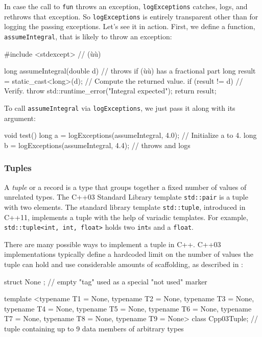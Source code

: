 In case the call to \lstinline!fun! throws an exception,
\lstinline!logExceptions! catches, logs, and rethrows that exception. So
\lstinline!logExceptions! is entirely transparent other than for logging
the passing exceptions. Let's see it in action. First, we define a
function, \lstinline!assumeIntegral!, that is likely to throw an exception:

\begin{emcppslisting}
#include <stdexcept>                     // (ù{}ù)

long assumeIntegral(double d)            // throws if (ù{}ù) has a fractional part
{
    long result = static_cast<long>(d);  // Compute the returned value.
    if (result != d)                     // Verify.
        throw std::runtime_error("Integral expected");
    return result;
}
\end{emcppslisting}
    

\noindent To call \lstinline!assumeIntegral! via \lstinline!logExceptions!, we just pass
it along with its argument:

\begin{emcppslisting}
void test()
{
    long a = logExceptions(assumeIntegral, 4.0);  // Initialize a to 4.
    long b = logExceptions(assumeIntegral, 4.4);  // throws and logs
}
\end{emcppslisting}
    

\subsubsection[Tuples]{Tuples}\label{tuples}

A \emph{tuple} or a record is a type that groups together a fixed number
of values of unrelated types. The C++03 Standard Library template
\lstinline!std::pair! is a tuple with two elements. The standard library
template \lstinline!std::tuple!, introduced in C++11, implements a tuple
with the help of variadic templates. For example,
\lstinline!std::tuple<int,!~\lstinline!int,!~\lstinline!float>! holds two
\lstinline!int!s and a \lstinline!float!.

There are many possible ways to implement a tuple in C++. C++03
implementations typically define a hardcoded limit on the number of
values the tuple can hold and use considerable amounts of scaffolding,
as described in :

\begin{emcppslisting}
struct None { };  // empty "tag" used as a special "not used" marker

template <typename T1 = None, typename T2 = None, typename T3 = None,
          typename T4 = None, typename T5 = None, typename T6 = None,
          typename T7 = None, typename T8 = None, typename T9 = None>
class Cpp03Tuple;
    // tuple containing up to 9 data members of arbitrary types
\end{emcppslisting}
    

